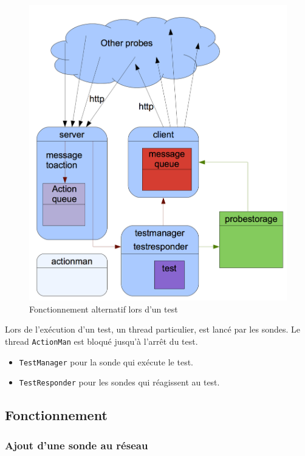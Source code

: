 \documentclass[a4paper,11pt]{article}
\newcommand{\cd}[1]{\texttt{#1}}
\begin{document}
\begin{figure}[!ht]
\centering\includegraphics[width=\linewidth]{img/graphTest.png}
\caption{Fonctionnement alternatif lors d'un test}
\end{figure}

Lors de l'exécution d'un test, un thread particulier, est lancé par les sondes. Le thread \cd{ActionMan} est bloqué jusqu'à l'arrêt du test.
\begin{itemize}
\item \cd{TestManager} pour la sonde qui exécute le test.
\item \cd{TestResponder} pour les sondes qui réagissent au test.
\end{itemize}



\subsection{Fonctionnement}

\subsubsection{Ajout d'une sonde au réseau}
\end{document}
